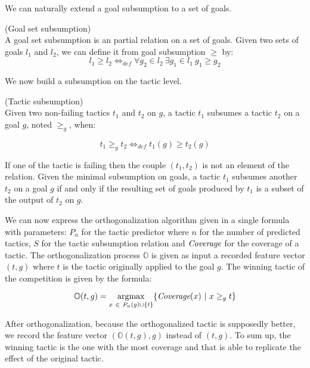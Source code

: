 \documentclass[runningheads,a4paper,draft]{svjour3}
\DeclareMathOperator*{\argmax}{\arg\!\max}
\begin{document}
We can naturally extend a goal subsumption to a set of goals.
\begin{definition} (Goal set subsumption)\\
A goal set subsumption is an partial relation on a set of goals.
Given two sets of goals $l_1$ and $l_2$, we can define it from goal 
subsumption $\ge$ by:
\[l_1 \ge l_2  \Leftrightarrow_{def} \forall g_2 \in l_2\ \exists g_1 \in l_1\ 
g_1 \ge g_2\]
\end{definition}


We now build a subsumption on the tactic level.
\begin{definition} (Tactic subsumption)\\  
Given two non-failing tactics $t_1$ and $t_2$ on $g$, a tactic $t_1$ subsumes a 
tactic $t_2$ on a goal $g$, noted $\ge_g$, when:

 \[t_1 \ge_g t_2 \Leftrightarrow_{def} t_1(g) \ge t_2(g)\]

If one of the tactic is failing then the couple $(t_1,t_2)$ is not an element 
of the 
relation.
Given the minimal subsumption on goals, a tactic $t_1$ subsumes another $t_2$ 
on a goal 
$g$ if and only if the resulting set of goals produced by $t_1$ is a subset 
of the output of $t_2$ on $g$. 
\end{definition}

We can now express the orthogonalization algorithm given in a single formula 
with parameters: $P_n$ for the tactic predictor where $n$ for the number of 
predicted
tactics, $S$ for the tactic subsumption relation and $\textit{\mbox{Coverage}}$ 
for the coverage of 
a tactic. The orthogonalization process $\mathbb{O}$ is given as input a 
recorded feature vector $(t,g)$ where $t$ is the tactic originally applied to 
the goal $g$. The winning tactic of the competition is given by the formula:


\[\mathbb{O}(t,g) = \argmax_{x\ \in\ P_n(g) \cup \lbrace t \rbrace} \lbrace 
\textit{\mbox{Coverage}}(x)\ 
|\ x \ge_g t\rbrace\] 
                   
After orthogonalization, because the orthogonalized tactic is supposedly 
better, we record the feature vector $(\mathbb{O}(t,g),g)$ instead of 
$(t,g)$. To sum up, the winning tactic is the one with the most coverage and 
that is able to replicate the effect of the original tactic.
\end{document}
